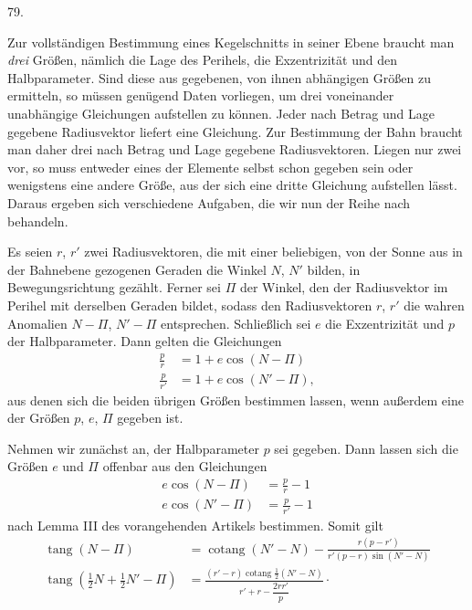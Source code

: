 \medskip
\hypertarget{native-108-article079}{}
\begin{center}79.\end{center}
Zur vollständigen Bestimmung eines Kegelschnitts in seiner Ebene braucht man \emph{drei} Größen, nämlich die Lage des Perihels, die Exzentrizität und den Halbparameter. Sind diese aus gegebenen, von ihnen abhängigen Größen zu ermitteln, so müssen genügend Daten vorliegen, um drei voneinander unabhängige Gleichungen aufstellen zu können. Jeder nach Betrag und Lage gegebene Radiusvektor liefert eine Gleichung. Zur Bestimmung der Bahn braucht man daher drei nach Betrag und Lage gegebene Radiusvektoren. Liegen nur zwei vor, so muss entweder eines der Elemente selbst schon gegeben sein oder wenigstens eine andere Größe, aus der sich eine dritte Gleichung aufstellen lässt. Daraus ergeben sich verschiedene Aufgaben, die wir nun der Reihe nach behandeln.
\par
Es seien $r$, $r'$ zwei Radiusvektoren, die mit einer beliebigen, von der Sonne aus in der Bahnebene gezogenen Geraden die Winkel $N$, $N'$ bilden, in Bewegungsrichtung gezählt. Ferner sei $\Pi$ der Winkel, den der Radiusvektor im Perihel mit derselben Geraden bildet, sodass den Radiusvektoren $r$, $r'$ die wahren Anomalien $N-\Pi$, $N'-\Pi$ entsprechen. Schließlich sei $e$ die Exzentrizität und $p$ der Halbparameter. Dann gelten die Gleichungen
\[
\begin{aligned}
\frac{p}{r}&=1+e\cos(N-\Pi)\\
\frac{p}{r'}&=1+e\cos(N'-\Pi),
\end{aligned}
\]
aus denen sich die beiden übrigen Größen bestimmen lassen, wenn außerdem eine der Größen $p$, $e$, $\Pi$ gegeben ist.
\par
Nehmen wir zunächst an, der Halbparameter $p$ sei gegeben. Dann lassen sich die Größen $e$ und $\Pi$ offenbar aus den Gleichungen
\[
\begin{aligned}
e\cos(N-\Pi)&=\frac{p}{r}-1\\
e\cos(N'-\Pi)&=\frac{p}{r'}-1
\end{aligned}
\]
nach Lemma III des vorangehenden Artikels bestimmen. Somit gilt
\[
\begin{aligned}
\operatorname{tang}(N-\Pi)&=\operatorname{cotang}(N'-N)-\frac{r(p-r')}{r'(p-r)\sin(N'-N)}\\[5pt]
\operatorname{tang}(\tfrac12N+\tfrac12N'-\Pi)&=\frac{(r'-r)\operatorname{cotang}\tfrac12(N'-N)}{r'+r-\dfrac{2rr'}{p}}\mathpunct{\cdot}
\end{aligned}
\]
